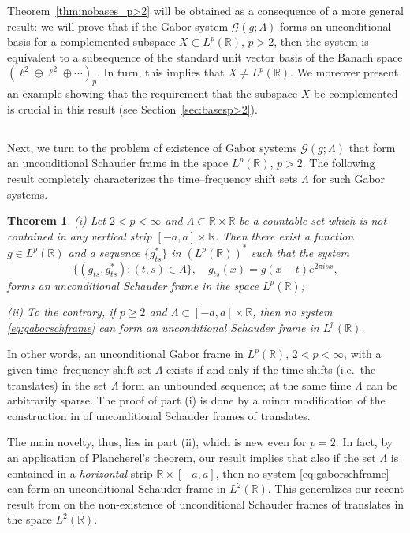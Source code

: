 \documentclass[reqno,a4paper,12pt]{amsart}
\numberwithin{equation}{section}
\numberwithin{figure}{section}
\newcommand\R{\mathbb{R}}
\newcommand\G{\mathcal{G}}
\newcommand\Lam{\Lambda}
\newcommand\1{\mathds{1}}
\newcommand{\gtsp}{g_{ts}^{\phantom{*}}}
\newcommand{\gtss}{g_{ts}^*}
\renewcommand\ge{\geqslant}
\newcommand\sbt{\subset}
\theoremstyle{plain}
\newtheorem{thm}{Theorem}[section]
\newcommand{\thmref}[1]{Theorem~\ref{#1}}
\newcommand{\secref}[1]{Section~\ref{#1}}
\theoremstyle{definition}
\begin{document}
\thmref{thm:nobases_p>2} will be obtained as a consequence of a more general result: we will prove that if the Gabor system $\G(g;\Lambda)$ forms an unconditional basis for a complemented subspace $X \sbt L^p(\R)$, $p>2$, then the system is equivalent to a subsequence of the standard unit vector basis of the Banach space $(\ell^2 \oplus\ell^2 \oplus\cdots)_p$. In turn, this implies that $X \ne L^p(\R)$. We moreover present an example showing that the requirement that the subspace $X$ be complemented is crucial in this result (see \secref{sec:basesp>2}).

\subsection{}
Next, we turn to the problem of existence of Gabor systems $\G(g;\Lambda)$ that form an unconditional Schauder frame in the space $L^p(\R)$, $p>2$. The following result completely characterizes the time--frequency shift sets $\Lam$ for such Gabor systems.




\begin{thm}\label{thm:framesp>2}
\textup{(i)} Let $2 < p < \infty$ and $\Lambda\subset\R \times \R$ be a countable set which is not contained in any vertical strip $[-a, a]\times \R$. Then there exist a function $g\in L^p(\R)$ and a sequence $\{ \gtss \}$ in $(L^p(\R))^*$ such that the system
\begin{equation}
\label{eq:gaborschframe}
\{(\gtsp, \gtss) : (t,s)\in\Lambda\}, \quad \gtsp(x) = g(x-t)e^{2\pi i s x},
\end{equation}
forms an unconditional Schauder frame in the space $L^p(\R)$;

\textup{(ii)} To the contrary, if $ p \ge 2$ and $\Lambda\subset [-a,a]\times\R$, then no system \eqref{eq:gaborschframe} can  form an unconditional Schauder frame in $L^p(\R)$.
\end{thm}

In other words, an unconditional Gabor frame  in $L^p(\R)$, $2 < p < \infty$, with a given time--frequency shift set $\Lam$ exists if and only if the time shifts (i.e.\ the translates) in the set $\Lam$ form an unbounded sequence; at the same time $\Lam$ can be arbitrarily sparse. The proof of part (i) is done by a minor modification of the construction in \cite{FOSZ14} of unconditional Schauder frames of translates. 

The main novelty, thus, lies in part (ii), which is new even for $p=2$. In fact, by an application of Plancherel's theorem, our result implies that also if the set $\Lam$ is contained in a \emph{horizontal} strip $\R \times [-a,a]$, then no system \eqref{eq:gaborschframe} can  form an uncon\-ditional Schauder frame in $L^2(\R)$. 
This generalizes our recent result from \cite{LT25a} on the non-existence of unconditional Schauder frames of translates in the space $L^2(\R)$.
\end{document}
